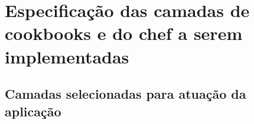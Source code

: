 \section{Especificação das camadas de cookbooks e do chef a serem implementadas}

\subsection{Camadas selecionadas para atuação da aplicação}

